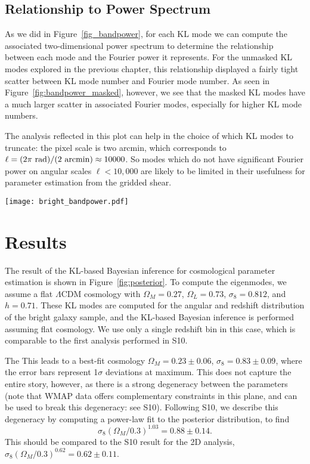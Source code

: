 \subsection{Relationship to Power Spectrum}
As we did in Figure~\ref{fig_bandpower}, for each KL mode we can compute the
associated two-dimensional power spectrum to determine the relationship
between each mode and the Fourier power it represents.  For the unmasked
KL modes explored in the previous chapter, this relationship displayed a
fairly tight scatter between KL mode number and Fourier mode number.
As seen in Figure~\ref{fig:bandpower_masked}, however, we see that the
masked KL modes have a much larger scatter in associated Fourier modes,
especially for higher KL mode numbers.

The analysis reflected in this plot can help in the choice of which KL
modes to truncate: the pixel scale is two arcmin, which corresponds to
$\ell = (2\pi\ {\rm rad}) / (2\ {\rm arcmin}) \approx 10000$.  So modes
which do not have significant Fourier power on angular scales
$\ell < 10,000$ are likely to be limited in their usefulness for parameter
estimation from the gridded shear.

\begin{figure*}
 \centering
 \texttt{[image: bright\_bandpower.pdf]}
 \caption{
   The fourier power represented by each KL mode.  For each KL mode number,
   the vertical band shows the distribution of power with angular wavenumber
   $\ell$.  In general, the larger KL modes correspond to larger values of
   $\ell$, though there is a lot of mode mixing.
   \label{fig:bandpower_masked}}
\end{figure*}

\section{Results}
\label{sec:results}
The result of the KL-based Bayesian inference for cosmological parameter
estimation is shown in Figure~\ref{fig:posterior}.  To compute the
eigenmodes, we assume a flat $\Lambda$CDM cosmology with
$\Omega_M = 0.27$, $\Omega_L = 0.73$, $\sigma_8 = 0.812$, and $h=0.71$.
These KL modes are computed for the angular and redshift distribution
of the bright galaxy sample, and the KL-based Bayesian inference is
performed assuming flat cosmology.  We use only a single redshift bin in
this case, which is comparable to the first analysis performed in
S10.

The 
This leads to a best-fit cosmology $\Omega_M = 0.23 \pm 0.06$,
$\sigma_8 = 0.83 \pm 0.09$, where the error bars represent 1$\sigma$
deviations at maximum.
This does not capture the entire story, however, as there
is a strong degeneracy between the parameters (note that WMAP data offers
complementary constraints in this plane, and can be used to break this
degeneracy: see S10).  Following S10, we describe this degeneracy by
computing a power-law fit to the posterior distribution, to find
\begin{equation}
  \sigma_8 (\Omega_M / 0.3) ^ {1.03} = 0.88 \pm 0.14.
\end{equation}
This should be compared to the S10 result for the 2D analysis,
$\sigma_8 (\Omega_M / 0.3) ^ {0.62} = 0.62 \pm 0.11$.

